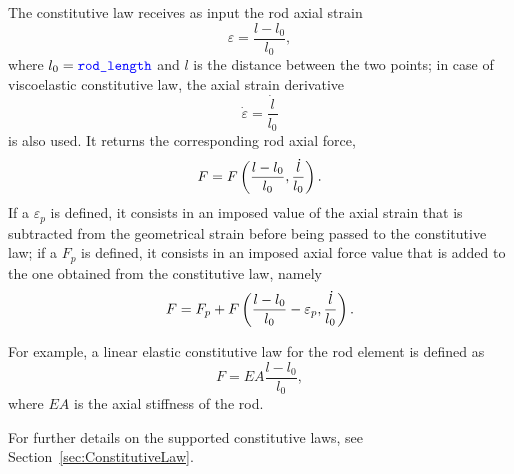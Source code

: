 The constitutive law  receives as input the rod axial strain
\begin{equation}
	\varepsilon = \frac{l - l_0}{l_0} ,
\end{equation}
where $l_0=\textcolor{blue}{\texttt{rod\_length}}$ and $l$ is the distance between the two points;
in case of viscoelastic constitutive law, the axial strain derivative
\begin{equation}
	\dot{\varepsilon} = \frac{\dot{l}}{l_0}
\end{equation}
is also used.
It returns the corresponding rod axial force,
\begin{displaymath}
	F = F\left( \frac{l - l_0}{l_0}, \frac{\dot{l}}{l_0} \right) .
\end{displaymath}
If a  $\varepsilon_p$ is defined,
it consists in an imposed value of the axial strain
that is subtracted from the geometrical strain
before being passed to the constitutive law;
if a  $F_p$ is defined,
it consists in an imposed axial force value
that is added to the one obtained from the constitutive law,
namely
\begin{displaymath}
	F = F_p + F\left( \frac{l - l_0}{l_0} - \varepsilon_p, \frac{\dot{l}}{l_0} \right) .
\end{displaymath}

For example, a linear elastic constitutive law for the rod element
is defined as
\begin{displaymath}
	F = EA \frac{l - l_0}{l_0} ,
\end{displaymath}
where $EA$ is the axial stiffness of the rod.

For further details on the supported constitutive laws, 
see Section~\ref{sec:ConstitutiveLaw}.



